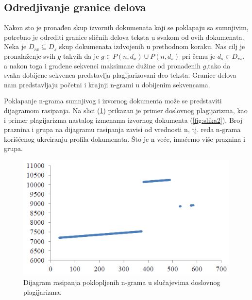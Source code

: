 \documentclass[a4paper]{article}
\begin{document}
\subsection{Odredjivanje granice delova}
\label{subsec:odredjivanje granice delova}

Nakon sto je pronađen skup izvornih dokumenata koji se poklapaju sa sumnjivim, potrebno je odrediti granice sličnih delova  teksta u svakom od ovih 
dokumenata. Neka je \( D_{rx} \subseteq D_{s} \) skup dokumenata izdvojenih u prethodnom koraku. Nas cilj je  pronalaženje  svih \(g\)  takvih da je
\(g\in P(n,d_{x}) \cup P(n,d_{s})\) pri čemu je \(d_{s} \in D_{rx}\), a nakon toga i građene sekvenci maksimane dužine od pronađenih \(g\),tako da svaka 
dobijene sekvenca predstavlja plagijarizovani deo teksta. Granice delova nam predstavljaju početni i krajnji n-grami u dobijenim sekvencama.  

\par Poklapanje n-grama sumnjivog i izvornog dokumenta može se predstaviti dijagramom rasipanja. Na slici (\ref{fig:slika1}) prikazan je  primer  
doslovnog plagijarizma, kao i primer plagijarizma nastalog izmenama izvornog dokumenta (\ref{fig:slika2}). Broj praznina i grupa na dijagramu rasipanja 
zavisi od vrednosti n, tj. reda n-grama korišćenog ukreiranju profila dokumenata. Što je n veće, imaćemo više praznina i grupa.

\begin{figure}[h!]
\begin{center}
\includegraphics[natwidth=520, natheight=290, scale=0.5]{slika1.PNG}
\end{center}
\caption{Dijagram rasipanja poklopljenih n-grama u slučajevima doslovnog plagijarizma.}
\label{fig:slika1}
\end{figure}
\end{document}
